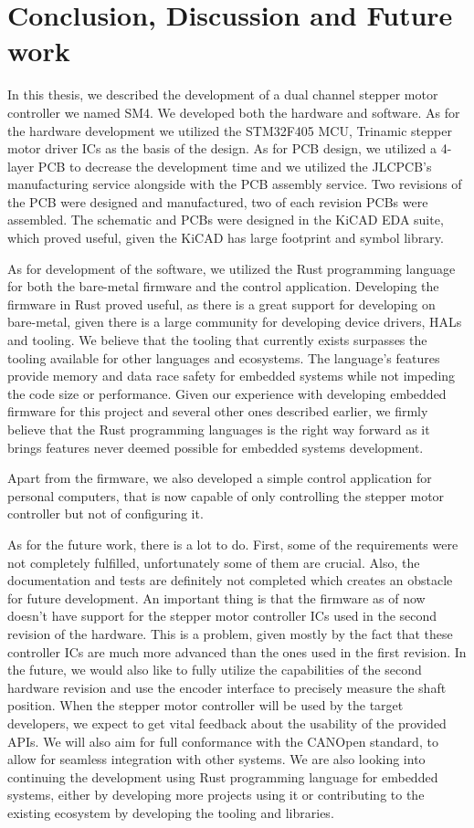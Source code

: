\chapter*{Conclusion, Discussion and Future work}
{}

In this thesis, we described the development of a dual channel stepper motor controller we named SM4.
We developed both the hardware and software.
As for the hardware development we utilized the STM32F405 MCU, Trinamic stepper motor driver ICs as the basis of the design.
As for PCB design, we utilized a 4-layer PCB to decrease the development time and we utilized the JLCPCB's manufacturing service alongside with the PCB assembly service.
Two revisions of the PCB were designed and manufactured, two of each revision PCBs were assembled.
The schematic and PCBs were designed in the KiCAD EDA suite, which proved useful, given the KiCAD has large footprint and symbol library.

As for development of the software, we utilized the Rust programming language for both the bare-metal firmware and the control application.
Developing the firmware in Rust proved useful, as there is a great support for developing on bare-metal, given there is a large community for developing device drivers, HALs and tooling.
We believe that the tooling that currently exists surpasses the tooling available for other languages and ecosystems.
The language's features provide memory and data race safety for embedded systems while not impeding the code size or performance.
Given our experience with developing embedded firmware for this project and several other ones described earlier, we firmly believe that the Rust programming languages is the right way forward as it brings features never deemed possible for embedded systems development.

Apart from the firmware, we also developed a simple control application for personal computers, that is now capable of only controlling the stepper motor controller but not of configuring it.

As for the future work, there is a lot to do.
First, some of the requirements were not completely fulfilled, unfortunately some of them are crucial.
Also, the documentation and tests are definitely not completed which creates an obstacle for future development.
An important thing is that the firmware as of now doesn't have support for the stepper motor controller ICs used in the second revision of the hardware.
This is a problem, given mostly by the fact that these controller ICs are much more advanced than the ones used in the first revision.
In the future, we would also like to fully utilize the capabilities of the second hardware revision and use the encoder interface to precisely measure the shaft position.
When the stepper motor controller will be used by the target developers, we expect to get vital feedback about the usability of the provided APIs.
We will also aim for full conformance with the CANOpen standard, to allow for seamless integration with other systems.
We are also looking into continuing the development using Rust programming language for embedded systems, either by developing more projects using it or contributing to the existing ecosystem by developing the tooling and libraries.
